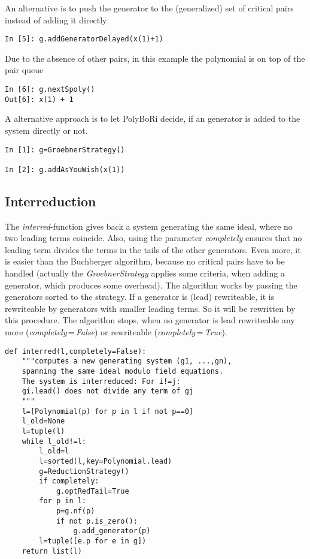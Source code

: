 \documentclass[]{article}
\newcommand{\functionname}[1]{\textit{#1}\xspace}
\newcounter{thm}
\begin{document}
An alternative is to push the generator to the (generalized) set of critical pairs instead of adding it directly
\begin{lstlisting}
In [5]: g.addGeneratorDelayed(x(1)+1)
\end{lstlisting}
Due to the absence of other pairs, in this example the polynomial is on top of the pair queue
\begin{lstlisting}
In [6]: g.nextSpoly()
Out[6]: x(1) + 1
\end{lstlisting}

A alternative approach is to let PolyBoRi decide, if an generator is added to the system directly or not.
\begin{lstlisting}
In [1]: g=GroebnerStrategy()

In [2]: g.addAsYouWish(x(1))
\end{lstlisting}

\subsection{Interreduction}
The \functionname{interred}-function gives back a system generating the same ideal, where no two leading terms coincide.
Also, using the parameter \functionname{completely} ensures that no leading term divides the terms in the tails of the other generators.
Even more, it is easier than the Buchberger algorithm, because no critical pairs have to be handled (actually the \functionname{GroebnerStrategy} applies some criteria, when adding a generator, which produces some overhead).
The algorithm works by passing the generators sorted to the strategy. If a generator is (lead) rewriteable, it is rewriteable by generators with smaller leading terms.
So it will be rewritten by this procedure.
The algorithm stops, when no generator is lead rewriteable any more (\functionname{completely}\,=\,\functionname{False}) or rewriteable (\functionname{completely}\,=\,\functionname{True}).
\begin{lstlisting}
def interred(l,completely=False):
    """computes a new generating system (g1, ...,gn), 
    spanning the same ideal modulo field equations.
    The system is interreduced: For i!=j: 
    gi.lead() does not divide any term of gj
    """
    l=[Polynomial(p) for p in l if not p==0]
    l_old=None
    l=tuple(l)
    while l_old!=l:
        l_old=l
        l=sorted(l,key=Polynomial.lead)
        g=ReductionStrategy()
        if completely:
            g.optRedTail=True
        for p in l:
            p=g.nf(p)
            if not p.is_zero():
                g.add_generator(p)
        l=tuple([e.p for e in g])
    return list(l)
\end{lstlisting}
\end{document}
